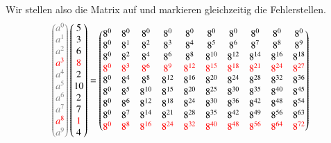 Wir stellen also die Matrix auf und markieren gleichzeitig die Fehlerstellen.
\[
\textcolor{gray}{
	\begin{pmatrix}
		a^0 \\ a^1 \\ a^2 \\ \textcolor{red}{a^3} \\ a^4 \\ a^5 \\ a^6 \\ a^7 \\ \textcolor{red}{a^8} \\ a^9 \\
\end{pmatrix}}
\begin{pmatrix}
	5 \\ 3 \\ 6 \\ \textcolor{red}{8} \\ 2 \\ 10 \\ 2 \\ 7 \\ \textcolor{red}{1} \\ 4 \\
\end{pmatrix}
=
\begin{pmatrix}
	8^0&    8^0&    8^0&    8^0&    8^0&    8^0&    8^0&    8^0&    8^0&    8^0\\
	8^0&	8^1&	8^2&	8^3&	8^4&	8^5&	8^6&	8^7&    8^8&	8^9\\
	8^0&	8^2&	8^4&	8^6&	8^8& 8^{10}& 8^{12}& 8^{14}& 8^{16}& 8^{18}\\
	\textcolor{red}{8^0}&	\textcolor{red}{8^3}&	\textcolor{red}{8^6}&	\textcolor{red}{8^9}& \textcolor{red}{8^{12}}& \textcolor{red}{8^{15}}& \textcolor{red}{8^{18}}& \textcolor{red}{8^{21}}& \textcolor{red}{8^{24}}& \textcolor{red}{8^{27}}\\
	8^0&	8^4&	8^8& 8^{12}& 8^{16}& 8^{20}& 8^{24}& 8^{28}& 8^{32}& 8^{36}\\
	8^0&	8^5& 8^{10}& 8^{15}& 8^{20}& 8^{25}& 8^{30}& 8^{35}& 8^{40}& 8^{45}\\
	8^0&	8^6& 8^{12}& 8^{18}& 8^{24}& 8^{30}& 8^{36}& 8^{42}& 8^{48}& 8^{54}\\
	8^0&	8^7& 8^{14}& 8^{21}& 8^{28}& 8^{35}& 8^{42}& 8^{49}& 8^{56}& 8^{63}\\
	\textcolor{red}{8^0}&	\textcolor{red}{8^8}& \textcolor{red}{8^{16}}& \textcolor{red}{8^{24}}& \textcolor{red}{8^{32}}& \textcolor{red}{8^{40}}& \textcolor{red}{8^{48}}& \textcolor{red}{8^{56}}& \textcolor{red}{8^{64}}& \textcolor{red}{8^{72}}\\

\end{pmatrix}\]
